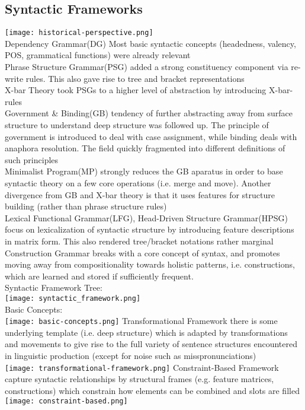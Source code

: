 \subsection*{Syntactic Frameworks}
\texttt{[image: historical-perspective.png]}\\
\scriptsize{Dependency Grammar(DG)} {\tiny Most basic syntactic concepts (headedness, valency, POS, grammatical functions) were already relevant}\\
\scriptsize{Phrase Structure Grammar(PSG)} {\tiny added a strong constituency component via re-write rules. This also gave rise to tree and bracket representations}\\
\scriptsize{X-bar Theory} {\tiny took PSGs to a higher level of abstraction by introducing X-bar-rules}\\
\scriptsize{Government \& Binding(GB)} {\tiny tendency of further abstracting away from surface structure to understand deep structure was followed up. The principle of government is introduced to deal with case assignment, while binding deals with anaphora resolution. The field quickly fragmented into different definitions of such principles}\\
\scriptsize{Minimalist Program(MP)} {\tiny strongly reduces the GB aparatus in order to base syntactic theory on a few core operations (i.e. merge and move). Another divergence from GB and X-bar theory is that it uses features for structure building (rather than phrase structure rules)}\\
\scriptsize{Lexical Functional Grammar(LFG), Head-Driven Structure Grammar(HPSG)} {\tiny focus on lexicalization of syntactic structure by introducing feature descriptions in matrix form. This also rendered tree/bracket notations rather marginal}\\
\scriptsize{Construction Grammar} {\tiny breaks with a core concept of syntax, and promotes moving away from compositionality towards holistic patterns, i.e. constructions, which are learned and stored if sufficiently frequent.}\\
\scriptsize{Syntactic Framework Tree:}\\
\texttt{[image: syntactic\_framework.png]}\\
\scriptsize{Basic Concepts:}\\
\texttt{[image: basic-concepts.png]}
\scriptsize{Transformational Framework} {\tiny there is some underlying template (i.e. deep structure) which is adapted by transformations and movements to give rise to the full variety of sentence structures encountered in linguistic production (except for noise such as misspronunciations)}\\
\texttt{[image: transformational-framework.png]}
\scriptsize{Constraint-Based Framework} {\tiny capture syntactic relationships by structural frames (e.g. feature matrices, constructions) which constrain how elements can be combined and slots are filled}\\
\texttt{[image: constraint-based.png]}

